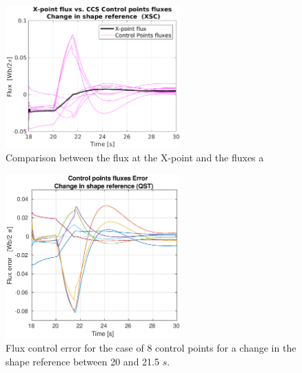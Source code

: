 \begin{figure}
	\begin{center}
		\includegraphics[width=0.6\textwidth]{Chp3/8_gaosXpointVSpoinsFlux_sqzd.eps}
	\end{center}	
	\caption{Comparison between the flux at the X-point and the fluxes a }
	\label{FluxesSqzd}
\end{figure}


\begin{figure}
	\begin{center}
		\includegraphics[width=0.6\textwidth]{Chp3/8_gaps_fluxesError_sqzd.eps}
	\end{center}	
	\caption{ Flux control error for the case of 8 control points for a change in the shape reference  between 20 and 21.5 $s $.}
	\label{errorFluxessqzd}
\end{figure}
